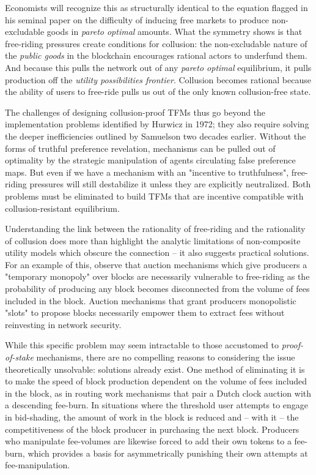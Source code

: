 \documentclass[oneside]{article}   	%
\begin{document}
Economists will recognize this as structurally identical to the equation \cite{samuelson1954pure} flagged in his seminal paper on the difficulty of inducing free markets to produce non-excludable goods in \textit{pareto optimal} amounts. What the symmetry shows is that free-riding pressures create conditions for collusion: the non-excludable nature of the \textit{public goods} in the blockchain encourages rational actors to underfund them. And because this pulls the network out of any \textit{pareto optimal} equilibrium, it pulls production off the \textit{utility possibilities frontier}. Collusion becomes rational because the ability of users to free-ride pulls us out of the only known collusion-free state.

The challenges of designing collusion-proof TFMs thus go beyond the implementation problems identified by Hurwicz in 1972; they also require solving the deeper inefficiencies outlined by Samuelson two decades earlier. Without the forms of truthful preference revelation, mechanisms can be pulled out of optimality by the strategic manipulation of agents circulating false preference maps. But even if we have a mechanism with an "incentive to truthfulness", free-riding pressures will still destabilize it unless they are explicitly neutralized. Both problems must be eliminated to build TFMs that are incentive compatible with collusion-resistant equilibrium.

Understanding the link between the rationality of free-riding and the rationality of collusion does more than highlight the analytic limitations of non-composite utility models which obscure the connection -- it also suggests practical solutions. For an example of this, observe that auction mechanisms which give producers a "temporary monopoly" over blocks are necessarily vulnerable to free-riding as the probability of producing any block becomes disconnected from the volume of fees included in the block. Auction mechanisms that grant producers monopolistic "slots" to propose blocks necessarily empower them to extract fees without reinvesting in network security.

While this specific problem may seem intractable to those accustomed to \textit{proof-of-stake} mechanisms, there are no compelling reasons to considering the issue theoretically unsolvable: solutions already exist. One method of eliminating it is to make the speed of block production dependent on the volume of fees included in the block, as in routing work mechanisms that pair a Dutch clock auction with a descending fee-burn. In situations where the threshold user attempts to engage in bid-shading, the amount of work in the block is reduced and -- with it -- the competitiveness of the block producer in purchasing the next block. Producers who manipulate fee-volumes are likewise forced to add their own tokens to a fee-burn, which provides a basis for asymmetrically punishing their own attempts at fee-manipulation.
\end{document}
